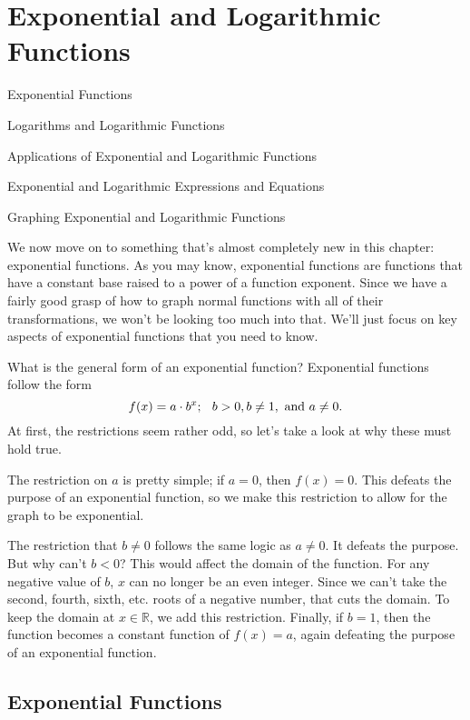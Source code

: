 \documentclass[../book.tex]{subfiles}
\begin{document}
\chapter{Exponential and Logarithmic Functions}
\begin{introduction}[Contents]
\item Exponential Functions
\item Logarithms and Logarithmic Functions
\item Applications of Exponential and Logarithmic Functions
\item Exponential and Logarithmic Expressions and Equations
\item Graphing Exponential and Logarithmic Functions
\end{introduction}
\noindent We now move on to something that's almost completely new in this chapter: exponential functions.  As you may know, exponential functions are functions that have a constant base raised to a power of a function exponent.  Since we have a fairly good grasp of how to graph normal functions with all of their transformations, we won’t be looking too much into that.  We’ll just focus on key aspects of exponential functions that you need to know.  

What is the general form of an exponential function?  Exponential functions follow the form $$f(x)=a\cdot b^x; \hspace{0.10in} b>0, b\neq 1, \text{ and } a\neq 0.$$
At first, the restrictions seem rather odd, so let's take a look at why these must hold true.

The restriction on $a$ is pretty simple; if $a=0$, then $f(x)=0$.  This defeats the purpose of an exponential function, so we make this restriction to allow for the graph to be exponential.

The restriction that $b\neq 0$ follows the same logic as $a\neq 0$.  It defeats the purpose.  But why can't $b<0$?  This would affect the domain of the function.  For any negative value of $b$, $x$ can no longer be an even integer.  Since we can't take the second, fourth, sixth, etc.  roots of a negative number, that cuts the domain.  To keep the domain at $x\in\mathbb{R}$, we add this restriction.  Finally, if $b=1$, then the function becomes a constant function of $f(x)=a$, again defeating the purpose of an exponential function.

\section{Exponential Functions}
\begin{wrapfigure}{r}{4cm}
\end{wrapfigure}
\end{document}
